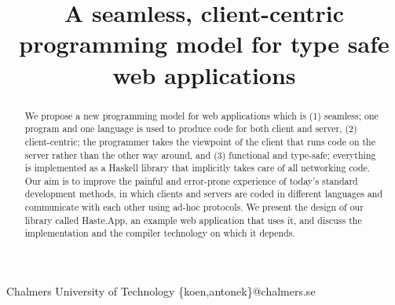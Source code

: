\documentclass[preprint]{sigplanconf}
\begin{document}
\setlength{\pdfpageheight}{\paperheight}
\setlength{\pdfpagewidth}{\paperwidth}






\title{A seamless, client-centric programming model for type safe web applications}

           {Chalmers University of Technology}
           {\{koen,antonek\}@chalmers.se}

\maketitle

\begin{abstract}
We propose a new programming model for web applications which is (1)
seamless; one program and one language is used to produce code for
both client and server, (2) client-centric; the programmer takes the
viewpoint of the client that runs code on the server rather than the
other way around, and (3) functional and type-safe; everything is
implemented as a Haskell library that implicitly takes care of all
networking code. Our aim is to improve the painful and error-prone
experience of today's standard development methods, in which clients
and servers are coded in different languages and communicate with each
other using ad-hoc protocols. We present the design of our library
called Haste.App, an example web application that uses it, and discuss
the implementation and the compiler technology on which it depends.
\end{abstract}

\end{document}
